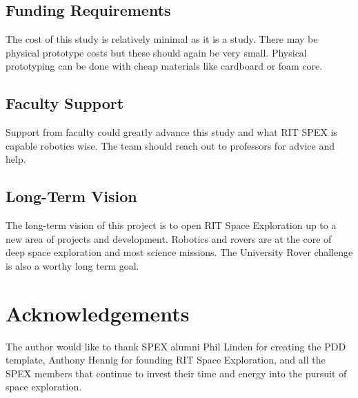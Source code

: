 \documentclass[conference]{IEEEtran} %
\begin{document}
\subsection{Funding Requirements}

The cost of this study is relatively minimal as it is a study. 
There may be physical prototype costs but these should again be very small. 
Physical prototyping can be done with cheap materials like cardboard or foam core.  

\subsection{Faculty Support}
Support from faculty could greatly advance this study and what RIT SPEX is capable robotics wise. The team should reach out to professors for advice and help.

\subsection{Long-Term Vision}
\label{sec:vision}
The long-term vision of this project is to open RIT Space Exploration up to a new area of projects and development. Robotics and rovers are at the core of deep space exploration and most science missions. The University Rover challenge is also a worthy long term goal. 

\section*{Acknowledgements}
The author would like to thank SPEX alumni Phil Linden for creating the PDD template, Anthony Hennig for founding RIT Space Exploration, and all the SPEX members that continue to invest their time and energy into the pursuit of space exploration.




\onecolumn
\appendices{}
\end{document}
